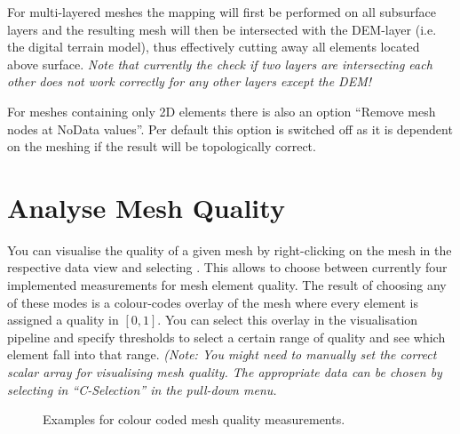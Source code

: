 For multi-layered meshes the mapping will first be performed on all subsurface layers and the resulting mesh will then be intersected with the DEM-layer (i.e. the digital terrain model), thus effectively cutting away all elements located above surface. \emph{Note that currently the check if two layers are intersecting each other does \emph{not} work correctly for any other layers except the DEM!}

For meshes containing only 2D elements there is also an option ``Remove mesh nodes at NoData values''. Per default this option is switched off as it is dependent on the meshing if the result will be topologically correct.


\section{Analyse Mesh Quality}

You can visualise the quality of a given mesh by right-clicking on the mesh in the respective data view and selecting . This allows to choose between currently four implemented measurements for mesh element quality. The result of choosing any of these modes is a colour-codes overlay of the mesh where every element is assigned a quality in $[0,1]$. You can select this overlay in the visualisation pipeline and specify thresholds to select a certain range of quality and see which element fall into that range. \emph{(Note: You might need to manually set the correct scalar array for visualising mesh quality. The appropriate data can be chosen by selecting in ``C-Selection'' in the  pull-down menu.}

\begin{figure}[tb]
\begin{center}
\enspace
{}\enspace
{}
\end{center}
\caption{Examples for colour coded mesh quality measurements.} \label{fig:mshqual}
\end{figure}

